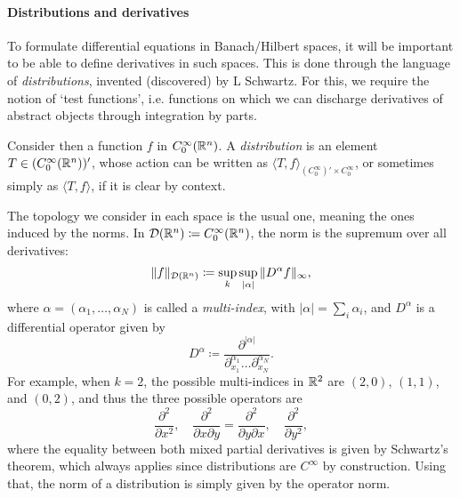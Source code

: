 \paragraph{Distributions and derivatives} 
{\color{blue}
To formulate differential equations in Banach/Hilbert spaces, it will be important to be able to define derivatives in such spaces. This is done through the language of \emph{distributions}, invented (discovered) by L Schwartz. For this, we require the notion of `test functions', i.e. functions on which we can discharge derivatives of abstract objects through integration by parts.
\begin{definition}
    Consider then a function $f$ in $C_0^\infty(\mathbb{R}^n)$. A \emph{distribution} is an element $T\in (C_0^\infty(\mathbb{R}^n))'$, whose action can be written as $\langle T, f\rangle_{(C_0^\infty)'\times C_0^\infty}$, or sometimes simply as $\langle T, f\rangle$, if it is clear by context. 
\end{definition}

The topology we consider in each space is the usual one, meaning the ones induced by the norms. In $\mathcal D(\mathbb{R}^n)\coloneqq C_0^\infty(\mathbb{R}^n)$, the norm is the supremum over all derivatives:
\begin{equation} %
    \| f \|_{\mathcal D(\R^n)} \coloneqq \sup_{k} \sup_{|\alpha|} \|D^\alpha f\|_\infty,
\end{equation}
where $\alpha=(\alpha_1, \hdots, \alpha_N)$ is called a \emph{multi-index}, with $|\alpha| = \sum_i \alpha_i$, and $D^\alpha$ is a differential operator given by 
\begin{equation}
    D^\alpha \coloneqq \frac{\partial^{|\alpha|}}{\partial^{\alpha_1}_{x_1}\hdots \partial^{\alpha_N}_{x_N}}.
\end{equation}
For example, when $k=2$, the possible multi-indices in $\mathbb{R}^2$ are $(2,0)$, $(1,1)$, and $(0,2)$, and thus the three possible operators are
\begin{equation*}
    \frac{\partial^2}{\partial x^2},\quad  \frac{\partial^2}{\partial x\partial y} = \frac{\partial^2}{\partial y\partial x},\quad \frac{\partial^2}{\partial y^2},
\end{equation*}
where the equality between both mixed partial derivatives is given by Schwartz's theorem, which always applies since distributions are $C^\infty$ by construction. 
Using that, the norm of a distribution is simply given by the operator norm. }

